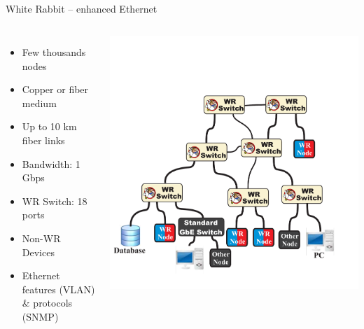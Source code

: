 \documentclass[compress,red]{beamer}
\begin{document}
\subsection{}
\begin{frame}{White Rabbit -- enhanced Ethernet}

\begin{columns}[c]
 

  \begin{itemize}
    \item Few thousands nodes
    \item Copper or fiber medium
    \item Up to 10 km fiber links
    \item Bandwidth: 1 Gbps
    \item WR Switch: 18 ports
    \item Non-WR Devices
    \item Ethernet features (VLAN) \& protocols (SNMP)
  \end{itemize}

    \begin{center}
    \includegraphics[width=1.0\textwidth]{network/WR_network-ethernet.pdf}
    \end{center}
\end{columns}

\end{frame}
\end{document}
